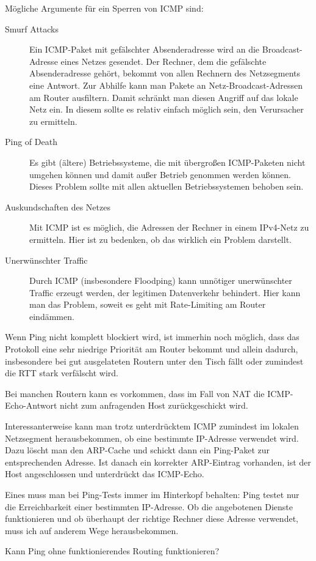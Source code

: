 \begin{normaltext}
  Mögliche Argumente für ein Sperren von ICMP sind:
  \begin{description}
    \item[Smurf Attacks] Ein ICMP-Paket mit gefälschter Absenderadresse wird
      an die Broadcast-Adresse eines Netzes gesendet. Der Rechner, dem die
      gefälschte Absenderadresse gehört, bekommt von allen Rechnern des
      Netzsegments eine Antwort.
      Zur Abhilfe kann man Pakete an Netz-Broadcast-Adressen am Router
      ausfiltern. Damit schränkt man diesen Angriff auf das lokale Netz ein.
      In diesem sollte es relativ einfach möglich sein, den Verursacher zu
      ermitteln.
    \item[Ping of Death] Es gibt (ältere) Betriebssysteme, die mit übergroßen
      ICMP-Paketen nicht umgehen können und damit außer Betrieb genommen
      werden können. Dieses Problem sollte mit allen aktuellen
      Betriebssystemen behoben sein.
    \item[Auskundschaften des Netzes] Mit ICMP ist es möglich, die Adressen
      der Rechner in einem IPv4-Netz zu ermitteln. Hier ist zu bedenken, ob
      das wirklich ein Problem darstellt.
    \item[Unerwünschter Traffic] Durch ICMP (insbesondere Floodping) kann
      unnötiger unerwünschter Traffic erzeugt werden, der legitimen
      Datenverkehr behindert. Hier kann man das Problem, soweit es geht mit
      Rate-Limiting am Router eindämmen.
  \end{description}

  Wenn Ping nicht komplett blockiert wird, ist immerhin noch möglich, dass das
  Protokoll eine sehr niedrige Priorität am Router bekommt und allein dadurch,
  insbesondere bei gut ausgelateten Routern unter den Tisch fällt oder
  zumindest die RTT stark verfälscht wird.

  Bei manchen Routern kann es vorkommen, dass im Fall von NAT die
  ICMP-Echo-Antwort nicht zum anfragenden Host zurückgeschickt wird.

  Interessanterweise kann man trotz unterdrücktem ICMP zumindest im lokalen
  Netzsegment herausbekommen, ob eine bestimmte IP-Adresse verwendet wird.
  Dazu löscht man den ARP-Cache und schickt dann ein Ping-Paket zur
  entsprechenden Adresse. Ist danach ein korrekter ARP-Eintrag vorhanden, ist
  der Host angeschlossen und unterdrückt das ICMP-Echo.

  Eines muss man bei Ping-Tests immer im Hinterkopf behalten: Ping testet nur
  die Erreichbarkeit einer bestimmten IP-Adresse. Ob die angebotenen Dienste
  funktionieren und ob überhaupt der richtige Rechner diese Adresse verwendet,
  muss ich auf anderem Wege herausbekommen.
  \begin{notes}
  \item Kann Ping ohne funktionierendes Routing funktionieren?
  \end{notes}
\end{normaltext}

